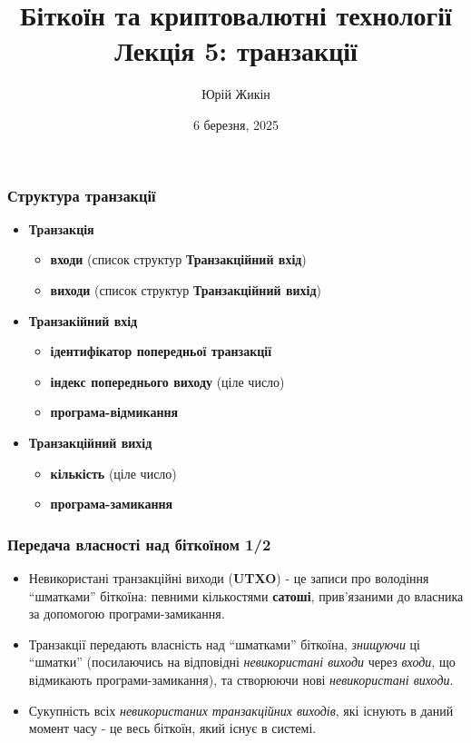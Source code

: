 \documentclass{beamer}
\title{
  Біткоїн та криптовалютні технології \\
  Лекція 5: транзакції
}
\author{Юрій Жикін}
\date{6 березня, 2025}
\begin{document}
\frame{\titlepage}

\begin{frame}
  \frametitle{Структура транзакції}
  \begin{itemize}
  \item \textbf{Транзакція}
    \begin{itemize}
    \item \textbf{входи} (список структур \textbf{Транзакційний вхід})
    \item \textbf{виходи} (список структур \textbf{Транзакційний вихід})
    \end{itemize}
  \item \textbf{Транзакійний вхід}
    \begin{itemize}
    \item \textbf{ідентифікатор попередньої транзакції}
    \item \textbf{індекс попереднього виходу} (ціле число)
    \item \textbf{програма-відмикання}
    \end{itemize}
  \item \textbf{Транзакційний вихід}
    \begin{itemize}
    \item \textbf{кількість} (ціле число)
    \item \textbf{програма-замикання}
    \end{itemize}
  \end{itemize}
\end{frame}

\begin{frame}[fragile]
  \frametitle{Передача власності над біткоїном 1/2}
  \begin{itemize}
  \item Невикористані транзакційні виходи (\textbf{UTXO}) - це записи про
    володіння ``шматками'' біткоїна: певними кількостями \textbf{сатоші},
    прив'язаними до власника за допомогою програми-замикання.
  \item Транзакції передають власність над ``шматками'' біткоїна,
    \textit{знищуючи} ці ``шматки'' (посилаючись на відповідні
    \textit{невикористані виходи} через \textit{входи}, що відмикають
    програми-замикання), та створюючи нові \textit{невикористані виходи}.
  \item Сукупність всіх \textit{невикористаних транзакційних виходів}, які
    існують в даний момент часу - це весь біткоїн, який існує в системі.
  \end{itemize}
\end{frame}
\end{document}
